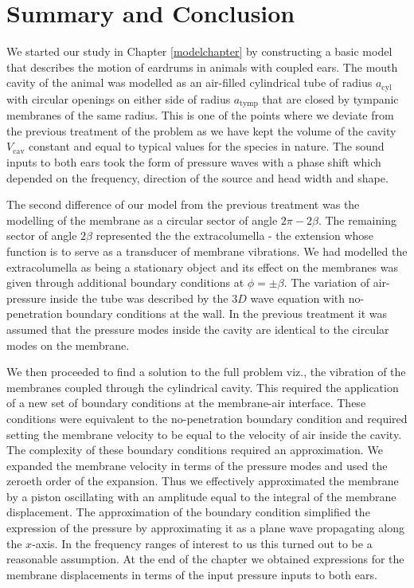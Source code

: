 \chapter{Summary and Conclusion}
We started our study in Chapter \ref{modelchapter} by constructing a basic model that describes the motion of eardrums in animals
with coupled ears. The mouth cavity of the animal was modelled as an air-filled cylindrical tube
of radius $a_{\mathrm{\mathrm{cyl}}}$ with circular openings on either side of radius $a_{\mathrm{tymp}}$ that are closed by
tympanic membranes of the same radius. This is one of the points where we deviate from the previous treatment
of the problem \cite{vossenjasa} as we have kept the volume of the cavity $V_{\mathrm{cav}}$ constant and equal to
typical values for the species in nature. The sound inputs to both ears took the form of pressure waves
with a phase shift which depended on the frequency, direction of the source and head width and shape.

The second difference of our model from the previous treatment was the modelling of the membrane
as a circular sector of angle $2\pi-2\beta$. The remaining sector of angle $2\beta$ represented the 
the extracolumella - the extension whose function is to serve as a transducer of
membrane vibrations. We had modelled the extracolumella as being a stationary object and its
effect on the membranes was given through additional boundary conditions at $\phi=\pm\beta$. The variation of air-pressure
inside the tube was described by the $3D$ wave equation with no-penetration boundary conditions at the wall. In the previous
treatment it was assumed that the pressure modes inside the cavity are identical to the circular modes on the membrane. 

We then proceeded to find a solution to the full problem viz., the vibration of the membranes coupled through the cylindrical
cavity. This required the application of a new set of boundary conditions at the membrane-air interface. These conditions were
equivalent to the no-penetration boundary condition and required setting the membrane velocity to be equal to the velocity of
air inside the cavity. The complexity of these boundary conditions required an approximation. We expanded the membrane 
velocity in terms of the pressure modes and used the zeroeth order of the expansion. Thus we effectively approximated the membrane
by a piston oscillating with an amplitude equal to the integral of the membrane displacement. The approximation of the boundary
condition simplified the expression of the pressure by approximating it as a plane wave propagating along the $x$-axis. In the
frequency ranges of interest to us this turned out to be a reasonable assumption. At the end of the chapter we obtained expressions
for the membrane displacements in terms of the input pressure inputs to both ears.

